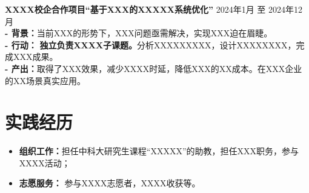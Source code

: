     \vspace{0.4em}
     {\large{\textbf{XXXX校企合作项目“基于XXX的XXXXX系统优化”}}} \hfill 2024年1月 至 2024年12月 \\
    \textbf{- 背景：}当前XXX的形势下，XXX问题亟需解决，实现XXX迫在眉睫。\\
    \textbf{- 行动：} \textbf{独立负责XXXX子课题。}分析XXXXXXXXX，设计XXXXXXXX，完成XXX成果。\\
    \textbf{- 产出：}取得了XXX效果，减少XXXX时延，降低XXX的XX成本。在XXX企业的XX场景真实应用。
    


    \section{\makebox[\widthof{\faChalkboardTeacher}][c]{\color{USTC_Blue}{\faChalkboardTeacher}}\quad 实践经历}
    \vspace{0.5em}
    \begin{itemize}[itemsep=-0.5ex]
        \item \textbf{组织工作：}担任中科大研究生课程“XXXXX”的助教，担任XXX职务，参与XXXX活动；
        \item \textbf{志愿服务：} 参与XXXX志愿者，XXXX收获等。
    \end{itemize}
    
  

